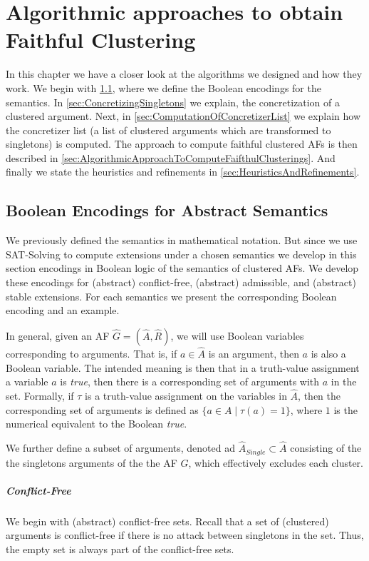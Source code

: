 \chapter{Algorithmic approaches to obtain Faithful Clustering}
In this chapter we have a closer look at the algorithms we designed and how they work.
We begin with \cref{sec:Encodings}, where we define the Boolean encodings for the semantics. In \cref{sec:ConcretizingSingletons} we explain, the concretization of a clustered argument. Next, in \cref{sec:ComputationOfConcretizerList} we explain how the concretizer list (a list of clustered arguments which are transformed to singletons) is computed. The approach to compute faithful clustered AFs is then described in \cref{sec:AlgorithmicApproachToComputeFaifthulClusterings}. And finally we state the heuristics and refinements in \cref{sec:HeuristicsAndRefinements}.


\section{Boolean Encodings for Abstract Semantics}
\label{sec:Encodings}
We previously defined the semantics in mathematical notation. But since we use SAT-Solving to compute extensions under a chosen semantics we develop in this section encodings in Boolean logic of the semantics of clustered AFs. We develop these encodings for (abstract) conflict-free, (abstract) admissible, and (abstract) stable extensions. For each semantics we present the corresponding Boolean encoding and an example.

In general, given an AF $\hat{G}=(\hat{A}, \hat{R})$, we will use Boolean variables corresponding to arguments. That is, if $a \in \hat{A}$ is an argument, then $a$ is also a Boolean variable. The intended meaning is then that in a truth-value assignment a variable $a$ is \emph{true}, then there is a corresponding set of arguments with $a$ in the set. Formally, if $\tau$ is a truth-value assignment on the variables in $\hat{A}$, then the corresponding set of arguments is defined as $\{a \in A \mid \tau(a) = 1\}$, where $1$ is the numerical equivalent to the Boolean \emph{true}.

We further define a subset of arguments, denoted ad $\hat{A}_{\mathit{Single}} \subset \hat{A}$ consisting of the the singletons arguments of the the AF $G$, which effectively excludes each cluster.


\paragraph{Conflict-Free} We begin with (abstract) conflict-free sets. Recall that a set of (clustered) arguments is conflict-free if there is no attack between singletons in the set. Thus, the empty set is always part of the conflict-free sets.

